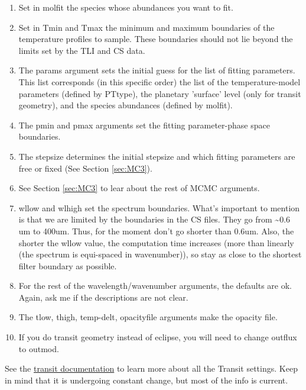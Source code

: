 \documentclass[letterpaper, 12pt]{article}
\begin{document}
\begin{enumerate}
\item \label{item:molfit} Set in {\ttb molfit} the species whose
abundances  you want to fit.

\item Set in {\tttb Tmin} and {\tttb Tmax} the minimum and maximum
boundaries of the temperature profiles to sample.  These boundaries
should not lie beyond the limits set by the TLI and CS data.

\item The {\tttb params} argument sets the initial guess for the list
of fitting parameters. This list corresponds (in this specific order)
the list of the temperature-model parameters (defined by {\tttb PTtype}),
the planetary 'surface' level (only for transit geometry), and the
species abundances (defined by {\tttb molfit}).

\item The {\tttb pmin} and {\tttb pmax} arguments set the fitting parameter-phase space boundaries.

\item The {\tttb stepsize} determines the initial stepsize and which
fitting parameters are free or fixed (See Section \ref{sec:MC3}).

\item See Section \ref{sec:MC3} to lear about the rest of MCMC arguments.

\item wllow and wlhigh set the spectrum boundaries.  What's important
to mention is that we are limited by the boundaries in the CS files.
They go from \sim0.6 um to 400um. Thus, for the moment don’t go shorter
than 0.6um. Also, the shorter the wllow value, the computation time
increases (more than linearly (the spectrum is equi-spaced in wavenumber)),
so stay as close to the shortest filter boundary as possible.

\item For the rest of the wavelength/wavenumber arguments, the defaults
are ok.  Again, ask me if the descriptions are not clear.

\item The tlow, thigh, temp-delt, opacityfile arguments make the opacity file.

\item If you do transit geometry instead of eclipse, you will need to change outflux to outmod.
\end{enumerate}


See the \href{https://github.com/exosports/transit/blob/master/doc/transit_user_manual.pdf}{transit documentation}  to learn more
about all the Transit settings. Keep in mind that it is undergoing constant change, but most of the
info is current.
\end{document}
